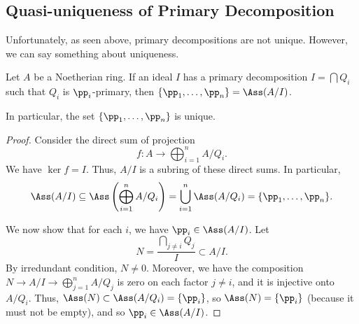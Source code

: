 \subsection{Quasi-uniqueness of Primary Decomposition}
Unfortunately, as seen above,
primary decompositions are not unique.
However, we can say something about uniqueness.
\begin{theorem}
    Let $A$ be a Noetherian ring.
    If an ideal $I$ has a primary decomposition $I=\bigcap Q_i$
    such that $Q_i$ is $\pp_i$-primary,
    then $\{\pp_1,\dots,\pp_n\} = \Ass(A/I)$.

    In particular, the set $\{\pp_1,\dots,\pp_n\}$
    is unique.
\end{theorem}
\begin{proof}
    Consider the direct sum of projection
    $$f : A\to \bigoplus_{i=1}^n A/Q_i.$$
    We have $\ker f = I$. Thus, $A/I$
    is a subring of these direct sums.
    In particular,
    $$\Ass(A/I) \subseteq \Ass\left(\bigoplus_{i=1}^n A/Q_i\right)
    = \bigcup_{i=1}^n \Ass(A/Q_i) = \{\pp_1,\dots,\pp_n\}.$$

    We now show that for each $i$, we have $\pp_i\in \Ass(A/I)$.
    Let
    $$N = \frac{\bigcap_{j\neq i} Q_j}{I}\subset A/I.$$
    By irredundant condition, 
    $N\neq 0$. Moreover, we have the composition
    $N\to A/I\to \bigoplus_{j=1}^n A/Q_j$ is zero on each factor $j\neq i$,
    and it is injective onto $A/Q_i$.
    Thus, $\Ass(N) \subset \Ass(A/Q_i) =  \{\pp_i\}$,
    so $\Ass(N) = \{\pp_i\}$ (because it must not be empty),
    and so $\pp_i\in\Ass(A/I)$.
\end{proof}

